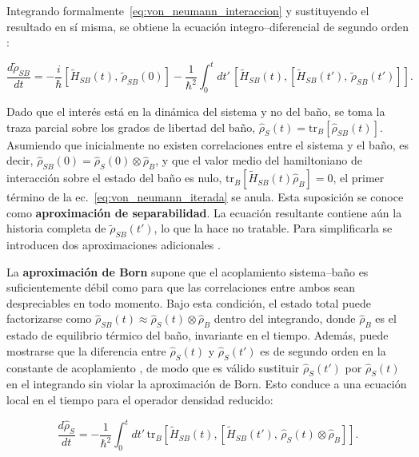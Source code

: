 Integrando formalmente~\eqref{eq:von_neumann_interaccion} y sustituyendo el resultado en sí misma, se obtiene la ecuación integro--diferencial de segundo orden \cite{brasil2013}:

\begin{equation}
	\frac{d\tilde{\rho}_{SB}}{dt} = -\frac{i}{\hbar}
	\left[\tilde{H}_{SB}(t),\,\tilde{\rho}_{SB}(0)\right]
	- \frac{1}{\hbar^2}\int_0^t dt'\,
	\left[\tilde{H}_{SB}(t),\left[\tilde{H}_{SB}(t'),\,
	\tilde{\rho}_{SB}(t')\right]\right].
	\label{eq:von_neumann_iterada}
\end{equation}

Dado que el interés está en la dinámica del sistema y no del baño, se toma la traza parcial sobre los grados de libertad del baño, $\hat{\rho}_S(t) = \mathrm{tr}_B[\hat{\rho}_{SB}(t)]$. Asumiendo que inicialmente no existen correlaciones entre el sistema y el baño, es decir, $\hat{\rho}_{SB}(0) = \hat{\rho}_S(0)\otimes\hat{\rho}_B$, y que el valor medio del hamiltoniano de interacción sobre el estado del baño es nulo, $\mathrm{tr}_B[\tilde{H}_{SB}(t)\hat{\rho}_B] = 0$, el primer término de la ec.~\eqref{eq:von_neumann_iterada} se anula. Esta suposición se conoce como \textbf{aproximación de separabilidad}. La ecuación resultante contiene aún la historia completa de $\tilde{\rho}_{SB}(t')$, lo que la hace no tratable. Para simplificarla se introducen dos aproximaciones adicionales \cite{brasil2013,breuerpetruccione2002}.

La \textbf{aproximación de Born} supone que el acoplamiento sistema--baño es suficientemente débil como para que las correlaciones entre ambos sean despreciables en todo momento. Bajo esta condición, el estado total puede factorizarse como $\hat{\rho}_{SB}(t) \approx \hat{\rho}_S(t)\otimes\hat{\rho}_B$ dentro del integrando, donde $\hat{\rho}_B$ es el estado de equilibrio térmico del baño, invariante en el tiempo. Además, puede mostrarse que la diferencia entre $\hat{\rho}_S(t)$ y $\hat{\rho}_S(t')$ es de segundo orden en la constante de acoplamiento \cite{brasil2013}, de modo que es válido sustituir $\hat{\rho}_S(t')$ por $\hat{\rho}_S(t)$ en el integrando sin violar la aproximación de Born. Esto conduce a una ecuación local en el tiempo para el operador densidad reducido:

\begin{equation}
	\frac{d\hat{\rho}_S}{dt} = -\frac{1}{\hbar^2}\int_0^t dt'\,
	\mathrm{tr}_B\!\left[\tilde{H}_{SB}(t),\left[\tilde{H}_{SB}(t'),\,
	\hat{\rho}_S(t)\otimes\hat{\rho}_B\right]\right].
	\label{eq:born_ecuacion}
\end{equation}

